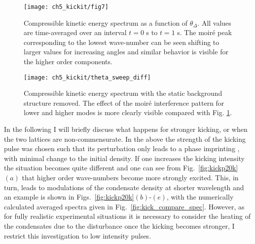 
	\begin{figure}
        \centering
		\texttt{[image: ch5\_kickit/fig7]}
		\caption[Compressible kinetic energy spectrum as a function of $\theta_\Delta$.]{Compressible kinetic energy spectrum as a function of $\theta_\Delta$. All values are time-averaged over an interval $t=0$ s to $t=1$ s. The moir\'e peak corresponding to the lowest wave-number can be seen shifting to larger values for increasing angles and similar behavior is visible for the higher order components.}
		\label{fig:dtheta_kspec}
	\end{figure}
    \begin{figure}
        \centering
        \texttt{[image: ch5\_kickit/theta\_sweep\_diff]}
        \caption[Compressible kinetic energy spectrum with the background structure removed.]{Compressible kinetic energy spectrum with the static background structure removed. The effect of the moir\'e interference pattern for lower and higher modes is more clearly visible compared with Fig. \ref{fig:dtheta_kspec}.}
        \label{fig:dtheta_kspec_backg}
    \end{figure}

    In the following I will briefly discuss what happens for stronger kicking, or when the two lattices are non-commensurate. In the above the strength of the kicking pulse was chosen such that its perturbation only leads to a phase imprinting \cite{Vtx:Dobrek_pra_1999,BEC:Denschlag_science_2000}, with minimal change to the initial density. If one increases the kicking intensity the situation becomes quite different and one can see from Fig.~\ref{fig:kickp20k}$(a)$ that higher order wave-numbers become more strongly excited. This, in turn, leads to modulations of the condensate density at shorter wavelength and an example is shown in Figs.~\ref{fig:kickp20k}$(b)$-$(e)$, with the numerically calculated averaged spectra given in Fig.~\ref{fig:kick_compare_spec}. However, as for fully realistic experimental situations it is necessary to consider the heating of the condensates due to the disturbance once the kicking becomes stronger, I restrict this investigation to low intensity pulses.

